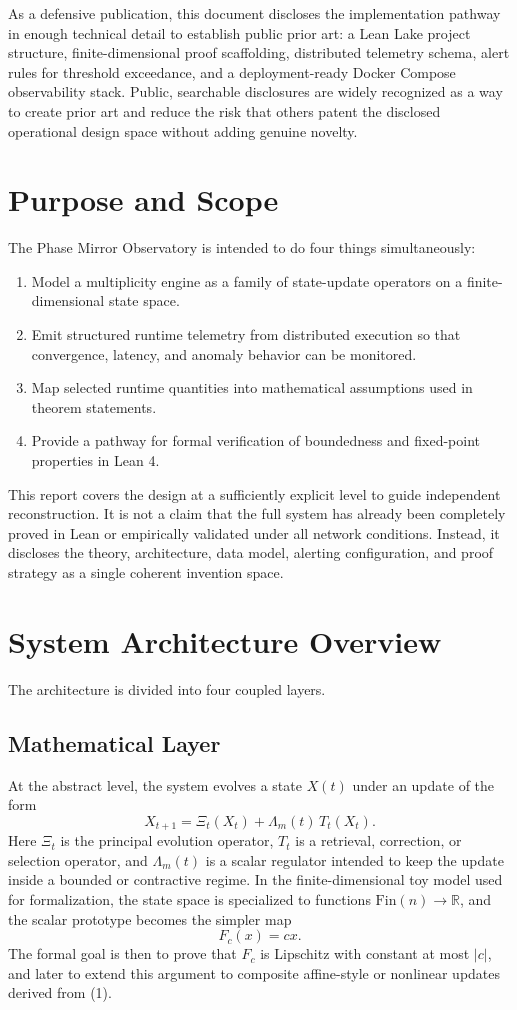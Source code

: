 \documentclass[11pt]{article}
\begin{document}
As a defensive publication, this document discloses the implementation pathway in enough technical detail to establish public prior art: a Lean Lake project structure, finite-dimensional proof scaffolding, distributed telemetry schema, alert rules for threshold exceedance, and a deployment-ready Docker Compose observability stack. Public, searchable disclosures are widely recognized as a way to create prior art and reduce the risk that others patent the disclosed operational design space without adding genuine novelty.

\section{Purpose and Scope}
The Phase Mirror Observatory is intended to do four things simultaneously:
\begin{enumerate}[label=\arabic*.]
    \item Model a multiplicity engine as a family of state-update operators on a finite-dimensional state space.
    \item Emit structured runtime telemetry from distributed execution so that convergence, latency, and anomaly behavior can be monitored.
    \item Map selected runtime quantities into mathematical assumptions used in theorem statements.
    \item Provide a pathway for formal verification of boundedness and fixed-point properties in Lean 4.
\end{enumerate}

This report covers the design at a sufficiently explicit level to guide independent reconstruction. It is not a claim that the full system has already been completely proved in Lean or empirically validated under all network conditions. Instead, it discloses the theory, architecture, data model, alerting configuration, and proof strategy as a single coherent invention space.
\newpage
\section{System Architecture Overview}
The architecture is divided into four coupled layers.

\subsection{Mathematical Layer}
At the abstract level, the system evolves a state $X(t)$ under an update of the form
\[
X_{t+1} = \Xi_t(X_t) + \Lambda_m(t) \, T_t(X_t). \tag{1}
\]
Here $\Xi_t$ is the principal evolution operator, $T_t$ is a retrieval, correction, or selection operator, and $\Lambda_m(t)$ is a scalar regulator intended to keep the update inside a bounded or contractive regime. In the finite-dimensional toy model used for formalization, the state space is specialized to functions $\mathrm{Fin}(n) \to \mathbb{R}$, and the scalar prototype becomes the simpler map
\[
F_c(x) = c x. \tag{2}
\]
The formal goal is then to prove that $F_c$ is Lipschitz with constant at most $|c|$, and later to extend this argument to composite affine-style or nonlinear updates derived from (1).
\end{document}
